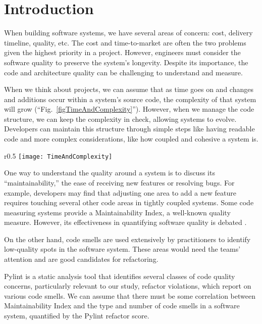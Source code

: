 \chapter{Introduction} \label{sectionIntroduction}


When building software systems, we have several areas of concern: cost, delivery timeline, quality, etc. The cost and time-to-market are often the two problems given the highest priority in a project. However, engineers must consider the software quality to preserve the system's longevity. Despite its importance, the code and architecture quality can be challenging to understand and measure.

When we think about projects, we can assume that as time goes on and changes and additions occur within a system's source code, the complexity of that system will grow (``Fig.~\ref{figTimeAndComplexity}''). However, when we manage the code structure, we can keep the complexity in check, allowing systems to evolve. Developers can maintain this structure through simple steps like having readable code and more complex considerations, like how coupled and cohesive a system is.

\begin{wrapfigure}{r}{0.5\textwidth}
    \centering
    \texttt{[image: TimeAndComplexity]}
    \caption{Generally speaking, a software system will get more complex as it grows over time.}
    \label{figTimeAndComplexity}
\end{wrapfigure}

One way to understand the quality around a system is to discuss its ``maintainability,'' the ease of receiving new features or resolving bugs. For example, developers may find that adjusting one area to add a new feature requires touching several other code areas in tightly coupled systems. Some code measuring systems provide a Maintainability Index, a well-known quality measure. However, its effectiveness in quantifying software quality is debated \cite{vandeursen:2014}.

On the other hand, code smells are used extensively by practitioners to identify low-quality spots in the software system. These areas would need the teams' attention and are good candidates for refactoring.

Pylint is a static analysis tool that identifies several classes of code quality concerns, particularly relevant to our study, refactor violations, which report on various code smells. We can assume that there must be some correlation between Maintainability Index and the type and number of code smells in a software system, quantified by the Pylint refactor score.

